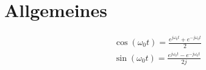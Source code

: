 \section{Allgemeines}

\begin{align*}
\cos(\omega_{0}t) = \frac{e^{j\omega_{0}t}+e^{-j\omega_{0}t}}{2}\\
\sin(\omega_{0}t) = \frac{e^{j\omega_{0}t}-e^{-j\omega_{0}t}}{2j}
\end{align*}